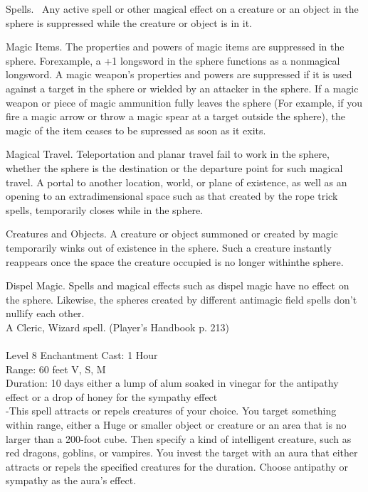 \documentclass[10pt,twocolumn]{report}
\begin{document}
Spells. 
 Any active spell or other magical effect on a creature or an object in the sphere is suppressed while the creature or object is in it. 

Magic Items. 
The properties and powers of magic items are suppressed in the sphere. Forexample, a +1 longsword in the sphere functions as a nonmagical longsword. A magic weapon’s properties and powers are suppressed if it is used against a target in the sphere or wielded by an attacker in the sphere. If a magic weapon or piece of magic ammunition fully leaves the sphere (For example, if you fire a magic arrow or throw a magic spear at a target outside the sphere), the magic of the item ceases to be supressed as soon as it exits. 

Magical Travel. 
Teleportation and planar travel fail to work in the sphere, whether the sphere is the destination or the departure point for such magical travel. A portal to another location, world, or plane of existence, as well as an opening to an extradimensional space such as that created by the rope trick spells, temporarily closes while in the sphere. 

Creatures and Objects. 
A creature or object summoned or created by magic temporarily winks out of existence in the sphere. Such a creature instantly reappears once the space the creature occupied is no longer withinthe sphere. 

Dispel Magic. 
Spells and magical effects such as dispel magic have no effect on the sphere. Likewise, the spheres created by different antimagic field spells don’t nullify each other.\\
A Cleric, Wizard spell. (Player's Handbook p. 213) \\


 \\
Level 8 \quad Enchantment \quad Cast: 1 Hour\\
Range: 60 feet \quad V, S, M\\
Duration: 10 days \quad either a lump of alum soaked in vinegar for the antipathy effect or a drop of honey for the sympathy effect\\
-This spell attracts or repels creatures of your choice. 
You target something within range, either a Huge or smaller object or creature or an area that is no larger than a 200-foot cube. Then specify a kind of intelligent creature, such as red dragons, goblins, or vampires. You invest the target with an aura that either attracts or repels the specified creatures for the duration. Choose antipathy or sympathy as the aura’s effect. 
\end{document}
